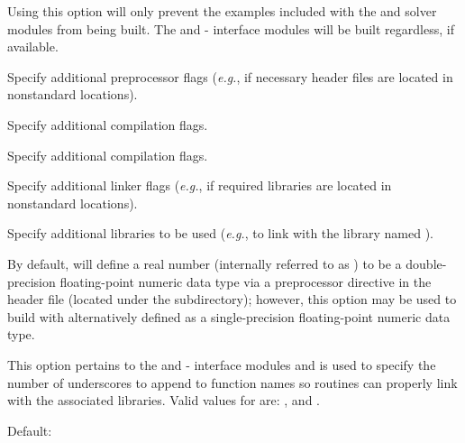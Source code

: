 \begin{config}
  Using this option will only prevent the {\F} examples included with the
  {\kinsol} and {\cvode} solver modules from being built. The {\fkinsol}
  and {\fcvode} {\F}-{\C} interface modules will be built regardless, if
  available.

\item {}

  Specify additional {\C} preprocessor flags 
  ({\em e.g.},  if necessary header files are located in nonstandard locations).

\item {}

  Specify additional {\C} compilation flags.

\item {}

  Specify additional {\F} compilation flags.

\item {}

  Specify additional linker flags 
  ({\em e.g.},  if required libraries are located in nonstandard locations).

\item {}

  Specify additional libraries to be used 
  ({\em e.g.},  to link with the library named ).

\item {}

  By default, {\sundials} will define a real number (internally referred to as
  ) to be a double-precision floating-point numeric data type via
  a preprocessor directive in the header file  (located under
  the  subdirectory); however, this option may be
  used to build {\sundials} with  alternatively defined as a
  single-precision floating-point numeric data type.

\item {}

  This option pertains to the {\fkinsol} and {\fcvode} {\F}-{\C} interface
  modules and is used to specify the number of underscores to append to
  function names so {\F} routines can properly link with the associated
  {\sundials} libraries. Valid values for  are: , 
  and .

  Default: 

\end{config}

